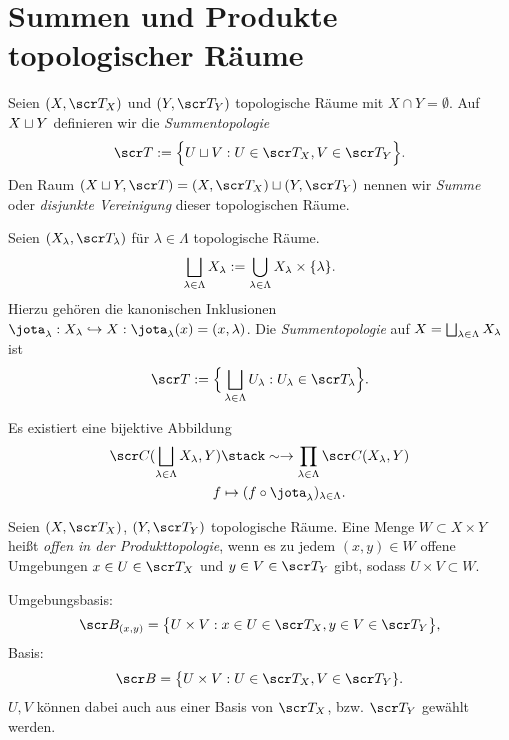 
\section{Summen und Produkte topologischer Räume}

\begin{df}
	Seien $(X, \scr T_X)$ und $(Y, \scr T_Y)$ topologische Räume mit $X \cap Y = \emptyset$.
	Auf $X \sqcup Y$ definieren wir die \emph{Summentopologie}
	\[
		\scr T
		:= \Big\{ U \dunion V : U \in \scr T_X, V \in \scr T_Y \Big\}.
	\]
	Den Raum $(X \dunion Y, \scr T) = (X, \scr T_X) \dunion (Y, \scr T_Y)$ nennen wir \emph{Summe} oder \emph{disjunkte Vereinigung} dieser topologischen Räume.
\end{df}

\begin{df}
	Seien $(X_\lambda, \scr T_\lambda)$ für $\lambda \in \Lambda$ topologische Räume.
	\[
		\bigsqcup_{\lambda \in \Lambda} X_\lambda
		:= \bigcup_{\lambda \in \Lambda} X_\lambda \times \{\lambda\}.
	\]
	Hierzu gehören die kanonischen Inklusionen $\jota_\lambda: X_\lambda \injto X : \jota_\lambda (x) = (x, \lambda)$.
	Die \emph{Summentopologie} auf $X = \bigsqcup_{\lambda \in \Lambda} X_\lambda$ ist
	\[
		\scr T
		:= \Big\{ \bigdunion_{\lambda \in \Lambda} U_\lambda : U_\lambda \in \scr T_\lambda \Big\}.
	\]
\end{df}

\begin{st}
	Es existiert eine bijektive Abbildung
	\begin{align*}
		\scr C(\bigdunion_{\lambda\in\Lambda} X_\lambda, Y) &\bijto \prod_{\lambda \in \Lambda} \scr C(X_\lambda, Y) \\
		f & \mapsto (f \circ \jota_\lambda)_{\lambda\in\Lambda}.
	\end{align*}
\end{st}

\begin{df}
	Seien $(X, \scr T_X)$, $(Y, \scr T_Y)$ topologische Räume.
	Eine Menge $W \subset X \times Y$ heißt \emph{offen in der Produkttopologie},
	wenn es zu jedem $(x,y) \in W$ offene Umgebungen $x \in U \in \scr T_X$ und $y \in V \in \scr T_Y$ gibt, sodass $U \times V \subset W$.
\end{df}

\begin{nt}
	Umgebungsbasis:
	\[
		\scr B_{(x,y)}
		= \big\{ U \times V : x \in U \in \scr T_X, y \in V \in \scr T_Y \big\},
	\]
	Basis:
	\[
		\scr B
		= \big \{ U \times V : U \in \scr T_X, V \in \scr T_Y \}.
	\]
	$U, V$ können dabei auch aus einer Basis von $\scr T_X$, bzw. $\scr T_Y$ gewählt werden.
\end{nt}

